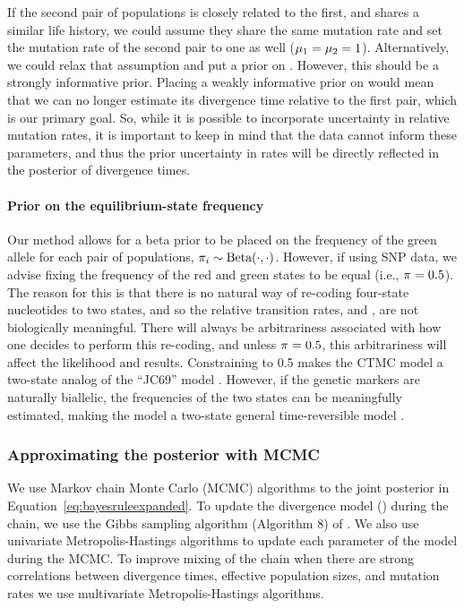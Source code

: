 If the second pair of populations is closely related to the first, and shares a
similar life history, we could assume they share the same mutation rate and
set the mutation rate of the second pair to one as well ($\murate[1] = \murate[2] = 1$).
Alternatively, we could relax that assumption and put a prior on \murate[2].
However, this should be a strongly informative prior.
Placing a weakly informative prior on \murate[2] would mean that we can no
longer estimate its divergence time relative to the first pair,
which is our primary goal.
So, while it is possible to incorporate uncertainty in relative mutation rates,
it is important to keep in mind that the data cannot inform these parameters,
and thus the prior uncertainty in rates will be directly reflected in the
posterior of divergence times.

\paragraph{Prior on the equilibrium-state frequency}
Our method allows for a beta prior to be placed on the frequency of the green
allele for each pair of populations,
$\gfreq[i] \sim \textrm{Beta}(\cdot, \cdot)$.
However, if using SNP data, we advise fixing the frequency of the red and green
states to be equal (i.e., $\gfreq = 0.5$).
The reason for this is that there is no natural way of re-coding four-state
nucleotides to two states, and so the relative transition rates, \rgmurate and
\grmurate, are not biologically meaningful.
There will always be arbitrariness associated with how one decides to perform
this re-coding, and unless $\gfreq = 0.5$, this arbitrariness will affect the
likelihood and results.
Constraining \gfreq to 0.5 makes the CTMC model a two-state analog of the
``JC69'' model \citep{JC1969}.
However, if the genetic markers are naturally biallelic, the frequencies of the
two states can be meaningfully estimated, making the model a two-state general
time-reversible model \citep{Tavare1986}.

% 
\subsubsection{Approximating the posterior with MCMC}

We use Markov chain Monte Carlo (MCMC) algorithms to  the joint posterior in
Equation~\ref{eq:bayesruleexpanded}.
To update the divergence model (\divtimemodel) during the chain, we use the
Gibbs sampling algorithm (Algorithm 8) of \citet{Neal2000}.
We also use univariate Metropolis-Hastings algorithms
\citep{Metropolis1953,Hastings1970} to update each parameter of the model
during the MCMC.
To improve mixing of the chain when there are strong correlations between
divergence times, effective population sizes, and mutation rates we use
multivariate Metropolis-Hastings algorithms.

